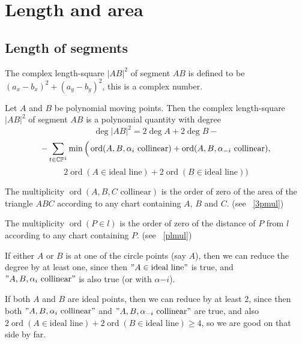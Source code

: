 \documentclass[a4paper]{article}
\newcommand{\ord}{\operatorname{ord}}
\begin{document}
\section{Length and area}

\subsection{Length of segments}

\begin{definition}
     The complex length-square $|AB|^2$ of segment $AB$ is defined to be $(a_x-b_x)^2+(a_y-b_y)^2$, this is a complex number.
\end{definition}

\begin{theorem}
    Let $A$ and $B$ be polynomial moving points. Then the complex length-square $|AB|^2$ of segment $AB$ is a polynomial quantity with degree
    $$\deg |AB|^2=2\deg A+2\deg B-$$
    $$-\sum_{t\in\cc\pp^1}\min\Big(\ord(A,B,\alpha_i\text{ collinear})+\ord(A,B,\alpha_{-i}\text{ collinear}),$$
    $$2\ord(A\in \text{ideal line})+2\ord(B\in \text{ideal line})\Big)$$
\end{theorem}
\begin{remark}
    The multiplicity $\ord(A,B,C\text{ collinear})$ is the order of zero of the area of the triangle $ABC$ according to any chart containing $A$, $B$ and $C$. (see ~\ref{3pmul})

    The multiplicity $\ord(P\in l)$ is the order of zero of the distance of $P$ from $l$ according to any chart containing $P$. (see ~\ref{plmul})
\end{remark}
\begin{remark}
    If either $A$ or $B$ is at one of the circle points (say $A$), then we can reduce the degree by at least one, since then $"A\in \text{ideal line}"$ is true, and $"A,B,\alpha_i\text{ collinear}"$ is also true (or with $\alpha{-i}$).

    If both $A$ and $B$ are ideal points, then we can reduce by at least 2, since then both $"A,B,\alpha_i\text{ collinear}"$ and $"A,B,\alpha_{-i}\text{ collinear}"$ are true, and also $2\ord(A\in \text{ideal line})+2\ord(B\in \text{ideal line})\ge 4$, so we are good on that side by far.
\end{remark}
\end{document}
